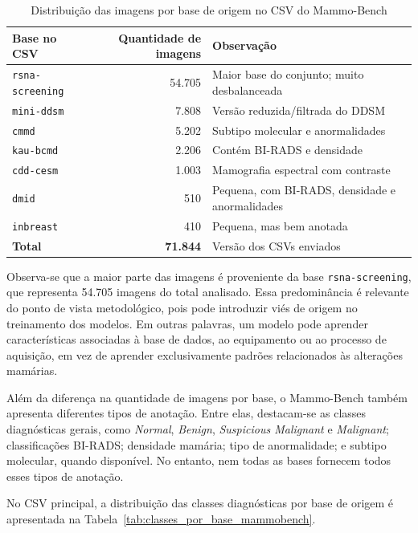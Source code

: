 \documentclass[
    12pt,
    openright,
    oneside,
    a4paper,
    english,
    brazil
]{abntex2}
\begin{document}
\begin{table}[H]
\centering
\caption{Distribuição das imagens por base de origem no CSV do Mammo-Bench}
\label{tab:distribuicao_bases_mammobench}
\begin{tabular}{lrl}
\hline
\textbf{Base no CSV} & \textbf{Quantidade de imagens} & \textbf{Observação} \\ \hline
\texttt{rsna-screening} & 54.705 & Maior base do conjunto; muito desbalanceada \\
\texttt{mini-ddsm}      & 7.808  & Versão reduzida/filtrada do DDSM \\
\texttt{cmmd}           & 5.202  & Subtipo molecular e anormalidades \\
\texttt{kau-bcmd}       & 2.206  & Contém BI-RADS e densidade \\
\texttt{cdd-cesm}       & 1.003  & Mamografia espectral com contraste \\
\texttt{dmid}           & 510    & Pequena, com BI-RADS, densidade e anormalidades \\
\texttt{inbreast}       & 410    & Pequena, mas bem anotada \\ \hline
\textbf{Total}          & \textbf{71.844} & Versão dos CSVs enviados \\ \hline
\end{tabular}
\end{table}

Observa-se que a maior parte das imagens é proveniente da base \texttt{rsna-screening}, que representa 54.705 imagens do total analisado. Essa predominância é relevante do ponto de vista metodológico, pois pode introduzir viés de origem no treinamento dos modelos. Em outras palavras, um modelo pode aprender características associadas à base de dados, ao equipamento ou ao processo de aquisição, em vez de aprender exclusivamente padrões relacionados às alterações mamárias.

Além da diferença na quantidade de imagens por base, o Mammo-Bench também apresenta diferentes tipos de anotação. Entre elas, destacam-se as classes diagnósticas gerais, como \textit{Normal}, \textit{Benign}, \textit{Suspicious Malignant} e \textit{Malignant}; classificações BI-RADS; densidade mamária; tipo de anormalidade; e subtipo molecular, quando disponível. No entanto, nem todas as bases fornecem todos esses tipos de anotação.

No CSV principal, a distribuição das classes diagnósticas por base de origem é apresentada na Tabela~\ref{tab:classes_por_base_mammobench}.
\end{document}
